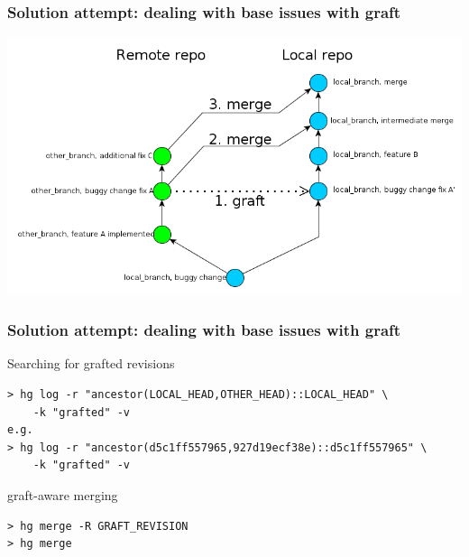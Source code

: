 \documentclass{beamer}
\begin{document}
\begin{frame}
\frametitle{Solution attempt: dealing with base issues with graft}
\begin{center}
\includegraphics[width=\textwidth]{img/graft_dealing_with_base}
\end{center}
\end{frame}

\begin{frame}[fragile]
\frametitle{Solution attempt: dealing with base issues with graft}
\begin{exampleblock}{Searching for grafted revisions}
\begin{Verbatim}[fontsize=\small]
> hg log -r "ancestor(LOCAL_HEAD,OTHER_HEAD)::LOCAL_HEAD" \
    -k "grafted" -v
e.g.
> hg log -r "ancestor(d5c1ff557965,927d19ecf38e)::d5c1ff557965" \
    -k "grafted" -v
\end{Verbatim}
\end{exampleblock}

\begin{exampleblock}{graft-aware merging}
\begin{verbatim}
> hg merge -R GRAFT_REVISION
> hg merge
\end{verbatim}
\end{exampleblock}
\end{frame}
\end{document}
